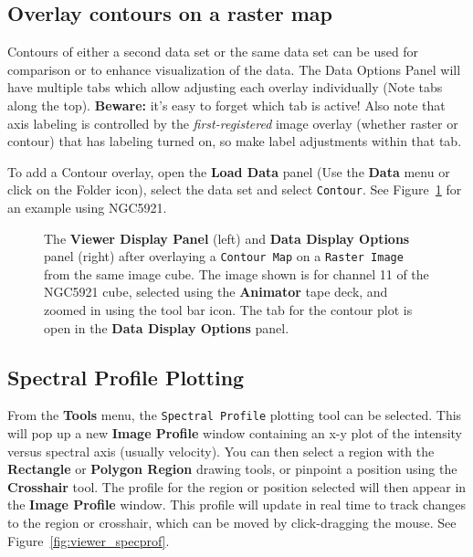 \subsection{Overlay contours on a raster map}
\label{section:display.image.viewcontours}

Contours of either a second data set or the same data set can be used
for comparison or to enhance visualization of the data. The Data Options
Panel will have multiple tabs which allow adjusting each overlay
individually (Note tabs along the top).  {\bf Beware:} it's easy to
forget which tab is active!   Also note that axis labeling is controlled
by the {\it first-registered} image overlay (whether raster or contour) that
has labeling turned on, so make label adjustments within that tab.

To add a Contour overlay, open the {\bf Load Data} panel (Use the {\bf Data}
menu or click on the Folder icon), select the data set and select {\tt Contour}.
See Figure~\ref{fig:viewer_rascon} for an example using NGC5921.

 
\begin{figure}[h!]
\caption{\label{fig:viewer_rascon} The {\bf Viewer Display Panel}
(left) and {\bf Data Display Options} panel (right) after overlaying
a {\tt Contour Map} on a {\tt Raster Image} from the same image cube.  The
image shown is for channel 11 of the NGC5921 cube, selected using
the {\bf Animator} tape deck, and zoomed in using the tool bar icon.
The tab for the contour plot is open in the {\bf Data Display Options} 
panel.} 
\hrulefill
\end{figure}

\subsection{Spectral Profile Plotting}
\label{section:display.image.specprof}

From the {\bf Tools} menu, the {\tt Spectral Profile} plotting
tool can be selected.  This will pop up a new {\bf Image Profile}
window containing an x-y plot of the intensity versus spectral
axis (usually velocity).  You can then select a region with the
{\bf Rectangle} or {\bf Polygon Region} drawing tools, or pinpoint
a position using the {\bf Crosshair} tool.  The profile
for the region or position selected will then appear in the
{\bf Image Profile} window.  This profile will update in real time
to track changes to the region or crosshair, which can be moved
by click-dragging the mouse.  See Figure~\ref{fig:viewer_specprof}.

